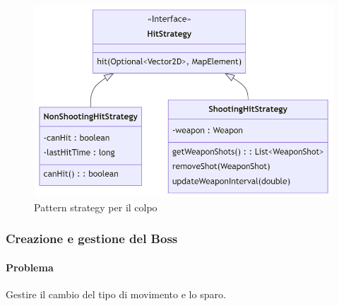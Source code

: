 \documentclass[a4paper,12pt]{report}
\begin{document}
\begin{figure}
    \centering{}
    \includegraphics[scale=0.5]{diagram/hitStrategy.png}
    \caption{Pattern strategy per il colpo}
    \label{img:hitStrategy}
\end{figure}
\newpage
\subsubsection{Creazione e gestione del Boss}
\paragraph{Problema}
Gestire il cambio del tipo di movimento e lo sparo.
\end{document}
